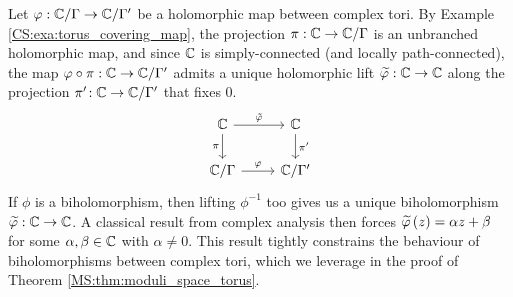 \documentclass[../Moduli_Spaces_of_Riemann_Surfaces.tex]{subfiles}
\begin{document}
    \begin{example}\label{CS:exa:lift_torus}
        Let $\varphi:\mathbb{C}/\Gamma\to\mathbb{C}/\Gamma'$ be a holomorphic map between complex tori. By Example \ref{CS:exa:torus_covering_map}, the projection $\pi:\mathbb{C}\to\mathbb{C}/\Gamma$ is an unbranched holomorphic map, and since $\mathbb{C}$ is simply-connected (and locally path-connected), the map $\varphi\circ\pi:\mathbb{C}\to\mathbb{C}/\Gamma'$ admits a unique holomorphic lift $\widetilde{\varphi}:\mathbb{C}\to\mathbb{C}$ along the projection $\pi'\!:\mathbb{C}\to\mathbb{C}/\Gamma'$ that fixes $0$.
        \begin{equation*}
            \begin{tikzcd}
                \C \ar[r, "\tilde{\phi}"] \ar[d, "\pi"'] & \C \ar[d, "\pi'"] \\
                \C/\Gamma \ar[r, "\phi"] & \C/\Gamma'
            \end{tikzcd}
        \end{equation*}
        If $\phi$ is a biholomorphism, then lifting $\phi^{-1}$ too gives us a unique biholomorphism $\widetilde{\varphi}:\mathbb{C}\to\mathbb{C}$. A classical result from complex analysis then forces $\widetilde{\varphi}\left(z\right)=\alpha z+\beta$ for some $\alpha,\beta\in\mathbb{C}$ with $\alpha\neq0$. This result tightly constrains the behaviour of biholomorphisms between complex tori, which we leverage in the proof of Theorem \ref{MS:thm:moduli_space_torus}.\exqed
    \end{example}
\end{document}
